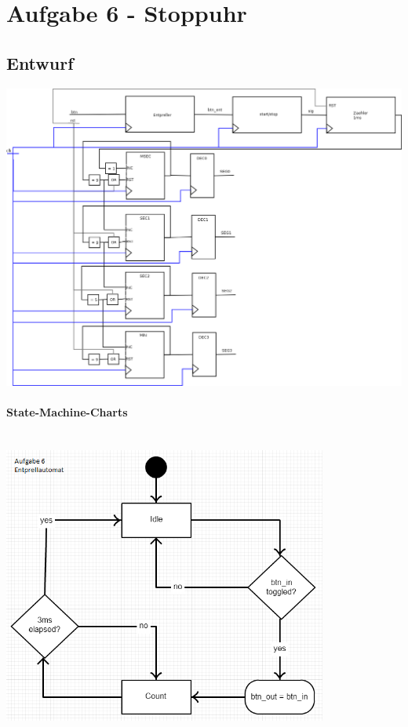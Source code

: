 \section{Aufgabe 6 - Stoppuhr}
\subsection{Entwurf}
\includegraphics[width=1\textwidth]{resources/06-stopuhr.png}
	\paragraph{State-Machine-Charts}\hfill \\

		\includegraphics[width=0.8\textwidth]{resources/06-Entprellautomat.png}
		

